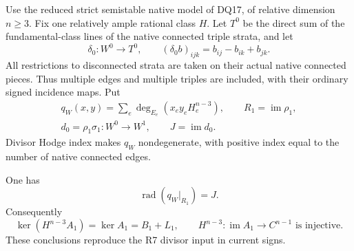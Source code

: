 Use the reduced strict semistable native model of DQ17, of relative
dimension $n\ge3$.  Fix one relatively ample rational class $H$.
Let $T^0$ be the direct sum of the fundamental-class lines of the
native connected triple strata, and let
\[
 \delta_0:W^0\longrightarrow T^0,\qquad
       (\delta_0b)_{ijk}=b_{ij}-b_{ik}+b_{jk}.
 \tag{PU18.1}\label{r18pu:delta}
\]
All restrictions to disconnected strata are taken on their actual
native connected pieces.  Thus multiple edges and multiple triples
are included, with their ordinary signed incidence maps.
Put
\[
 \begin{gathered}
 q_W(x,y)=\sum_e\deg_{E_e}(x_ey_eH_e^{n-3}),\qquad
 R_1=\operatorname{im}\rho_1,\\
 d_0=\rho_1\sigma_1:W^0\to W^1,\qquad J=\operatorname{im}d_0 .
 \end{gathered}
 \tag{PU18.2}\label{r18pu:edge-form}
\]
Divisor Hodge index makes $q_W$ nondegenerate, with positive
index equal to the number of native connected edges.

\begin{lemma}
\label{r18pu:radical}
One has
\[
                       \operatorname{rad}(q_W|_{R_1})=J.
 \tag{PU18.3}\label{r18pu:radical-equality}
\]
Consequently
\[
 \ker(H^{n-3}A_1)=\ker A_1=B_1+L_1,
 \qquad
 H^{n-3}:\operatorname{im}A_1\longrightarrow C^{n-1}
                           \text{ is injective}.
 \tag{PU18.4}\label{r18pu:weighted-kernel}
\]
These conclusions reproduce the R7 divisor input in current signs.
\end{lemma}

